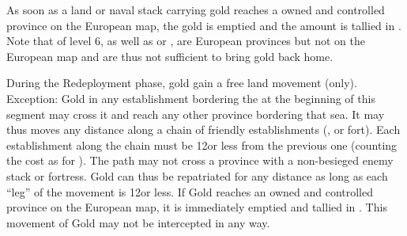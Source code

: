 \bparag As soon as a land or naval stack carrying gold reaches a owned and
controlled province on the European map, the gold is emptied and the amount is
tallied in .
\bparag Note that \COL of level 6, as well as \provinceAcores or
, are European provinces but not on the European map
and are thus not sufficient to bring gold back home.

\label{chRedep:Gold Transportation}
\bparag During the Redeployment phase, gold gain a free land movement (only).
\bparag Exception: Gold in any establishment bordering the \seazoneCaspienne
at the beginning of this segment may cross it and reach any other province
bordering that sea.
\bparag It may thus moves any distance along a chain of friendly
establishments (\COL, \TP or fort).
\bparag Each establishment along the chain must be 12\MP or less from the
previous one (counting the cost as for \LD).
\bparag The path may not cross a province with a non-besieged enemy stack or
fortress.
\bparag Gold can thus be repatriated for any distance as long as each ``leg''
of the movement is 12\MP or less.
\bparag If Gold reaches an owned and controlled province on the European map,
it is immediately emptied and tallied in .
\bparag This movement of Gold may not be intercepted in any way.


